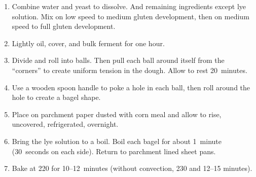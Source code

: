 
\begin{minipage}{.49\textwidth}

  \begin{ingredients}
  \end{ingredients}
\end{minipage}
\begin{minipage}{.49\textwidth}

  \begin{ingredients}
  \end{ingredients}
\end{minipage}

\begin{recipe}
  \begin{enumerate}

  \item Combine water and yeast to dissolve.  And remaining
    ingredients except lye solution.  Mix on low speed to medium
    gluten development, then on medium speed to full gluten
    development.

  \item Lightly oil, cover, and bulk ferment for one hour.

  \item Divide and roll into balls.  Then pull each ball around itself
    from the ``corners'' to create uniform tension in the dough.
    Allow to rest 20~minutes.

  \item Use a wooden spoon handle to poke a hole in each ball, then
    roll around the hole to create a bagel shape.

  \item Place on parchment paper dusted with corn meal and allow to
    rise, uncovered, refrigerated, overnight.

  \item Bring the lye solution to a boil.  Boil each bagel for about
    1~minute (30~seconds on each side).  Return to parchment lined
    sheet pans.

  \item Bake at 220\degreeC{} for 10--12~minutes (without convection,
    230\degreeC{} and 12--15 minutes).
    

  \end{enumerate}
\end{recipe}
